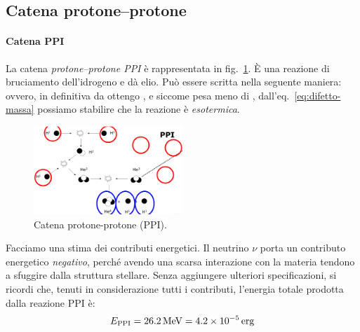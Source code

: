 \subsection{Catena protone--protone}\label{sec:catena-pp}
\paragraph{Catena PPI}
La catena \emph{protone--protone PPI} è rappresentata in fig.~\ref{fig:catena-pp1}. È una reazione di bruciamento dell'idrogeno e dà elio. Può essere scritta nella seguente maniera:
ovvero, in definitiva da  ottengo , e siccome  pesa meno di , dall'eq.~\eqref{eq:difetto-massa} possiamo stabilire che la reazione è \emph{esotermica}.

\begin{figure}
    \centering
    \includegraphics[width=0.5\textwidth]{immagini/catena-pp1.png}
    \caption{Catena protone-protone (PPI).}
    \label{fig:catena-pp1}
\end{figure}

Facciamo una stima dei contributi energetici. Il neutrino $\nu$ porta un contributo energetico \emph{negativo}, perché avendo una scarsa interazione con la materia tendono a sfuggire dalla struttura stellare. Senza aggiungere ulteriori specificazioni, si ricordi che, tenuti in considerazione tutti i contributi, l'energia totale prodotta dalla reazione PPI è:
\begin{equation}\label{eq:energia-pp1}
    E_\textup{PPI} = \SI{26.2}{MeV} = \SI{4.2e-5}{erg}
\end{equation}

